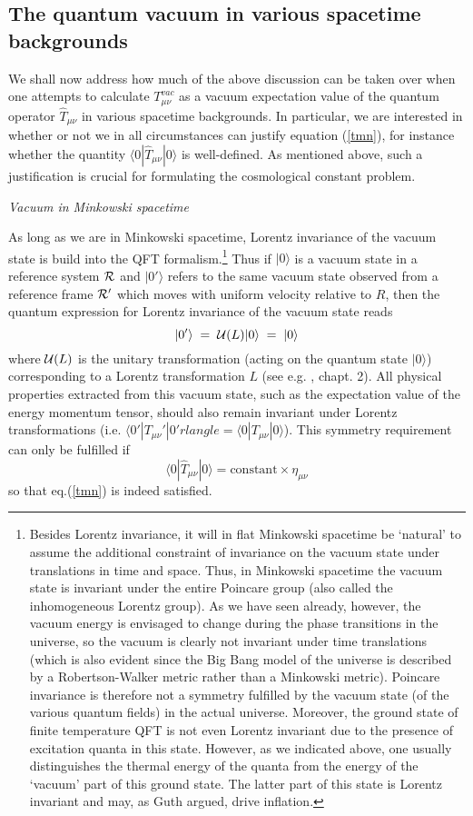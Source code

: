 \documentclass[12pt]{article}
\def\ss{\subsection}
\begin{document}
\ss{The quantum vacuum in various spacetime backgrounds}

We shall now address how much of the above discussion can be taken
over when one attempts to calculate $T^{vac}_{\mu\nu}$ as a vacuum
expectation value of the quantum operator $\hat{T}_{\mu \nu}$ in
various spacetime backgrounds. In particular, we are interested in
whether or not we in all circumstances can justify equation
(\ref{tmn}), for instance whether the quantity $\langle 0|\hat{T}_{\mu\nu}|0 \rangle $ is
well-defined. As mentioned above, such a justification is crucial
for formulating the cosmological constant problem.

{\em Vacuum in Minkowski spacetime}

As long as we are in Minkowski spacetime, Lorentz invariance of
the vacuum state is build into the QFT formalism.\footnote{Besides
Lorentz invariance, it will in flat Minkowski spacetime be
`natural' to assume the additional constraint of invariance on the
vacuum state under translations in time and space. Thus, in
Minkowski spacetime the vacuum state is invariant under the entire
Poincare group (also called the inhomogeneous Lorentz group). As
we have seen already, however, the vacuum energy is envisaged to
change during the phase transitions in the universe, so the vacuum
is clearly not invariant under time translations (which is also
evident since the Big Bang model of the universe is described by a
Robertson-Walker metric rather than a Minkowski metric). Poincare
invariance is therefore not a symmetry fulfilled by the vacuum
state (of the various quantum fields) in the actual universe.
Moreover, the ground state of finite temperature QFT is not even
Lorentz invariant due to the presence of excitation quanta in this
state. However, as we indicated above, one usually distinguishes
the thermal energy of the quanta from the energy of the `vacuum'
part of this ground state. The latter part of this state is
Lorentz invariant and may, as Guth argued, drive inflation.} Thus
if $|0 \rangle $ is a vacuum state in a reference system $\cal{R}$ and
$|0'\rangle$ refers to the same vacuum state observed from a reference
frame $\cal{R'}$ which moves with uniform velocity relative to
$R$, then the quantum expression for Lorentz invariance of the
vacuum state reads
$$|0'\rangle\; =\; {\cal{U}}(L)|0 \rangle \;=\;|0 \rangle $$
where ${\cal{U}}(L)$ is the unitary transformation (acting on
the quantum state $|0 \rangle $) corresponding to a Lorentz transformation $L$
(see e.g. \cite{weinberg96}, chapt. 2).
All physical properties extracted from this vacuum state, such as the 
expectation value of the energy momentum tensor,
should also remain invariant under Lorentz transformations 
(i.e. $\langle 0'|T_{\mu\nu}'|0'rlangle = \langle 0|T_{\mu\nu}|0 \rangle $). This symmetry
requirement can only be fulfilled if
$$\langle 0|\hat{T}_{\mu \nu}|0 \rangle = \mbox{constant} \times \eta_{\mu\nu}$$
so that eq.(\ref{tmn}) is indeed satisfied.  
\end{document}

